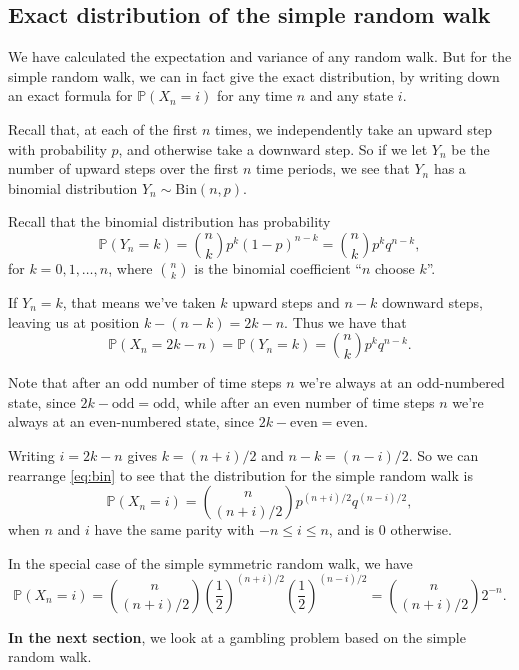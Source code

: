\documentclass[
  a4paper,
]{article}
\theoremstyle{definition}
\theoremstyle{definition}
\theoremstyle{definition}
\theoremstyle{remark}
\begin{document}
\hypertarget{exact-distribution}{%
\subsection{Exact distribution of the simple random walk}\label{exact-distribution}}

We have calculated the expectation and variance of any random walk. But for the simple random walk, we can in fact give the exact distribution, by writing down an exact formula for \(\mathbb P(X_n = i)\) for any time \(n\) and any state \(i\).

Recall that, at each of the first \(n\) times, we independently take an upward step with probability \(p\), and otherwise take a downward step. So if we let \(Y_n\) be the number of upward steps over the first \(n\) time periods, we see that \(Y_n\) has a binomial distribution \(Y_n \sim \text{Bin}(n,p)\).

Recall that the binomial distribution has probability
\[  \mathbb P(Y_n = k)  = \binom nk p^k (1-p)^{n-k} = \binom nk p^k q^{n-k} , \]
for \(k = 0,1,\dots, n\), where \(\binom{n}{k}\) is the binomial coefficient ``\(n\) choose \(k\)''.

If \(Y_n = k\), that means we've taken \(k\) upward steps and \(n-k\) downward steps, leaving us at position \(k - (n-k) = 2k - n\). Thus we have that
\begin{equation}
  \mathbb P(X_n = 2k - n) = \mathbb P(Y_n = k) = \binom nk p^k q^{n-k} .  \label{eq:bin}
  \end{equation}

Note that after an odd number of time steps \(n\) we're always at an odd-numbered state, since \(2k - \text{odd} = \text{odd}\), while after an even number of time steps \(n\) we're always at an even-numbered state, since \(2k - \text{even} = \text{even}\).

Writing \(i = 2k - n\) gives \(k = (n+i)/2\) and \(n-k = (n-i)/2\). So we can rearrange \eqref{eq:bin} to see that the distribution for the simple random walk is
\[ \mathbb P(X_n = i) =  \binom{n}{(n+i)/2} p^{(n+i)/2} q^{(n-i)/2} , \]
when \(n\) and \(i\) have the same parity with \(-n \leq i \leq n\), and is \(0\) otherwise.

In the special case of the simple symmetric random walk, we have
\[ \mathbb P(X_n = i) = \binom{n}{(n+i)/2} \left(\frac12\right)^{(n+i)/2} \left(\frac12\right)^{(n-i)/2} = \binom{n}{(n+i)/2} 2^{-n} . \]

\textbf{In the next section}, we look at a gambling problem based on the simple random walk.
\end{document}
